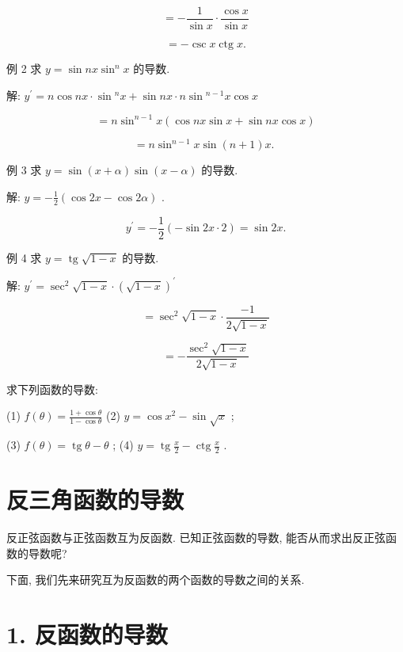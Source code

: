 \documentclass[lang=cn,newtx,12pt,scheme=chinese]{elegantbook}
\begin{document}
\[
= - \frac{1}{\sin x} \cdot \frac{\cos x}{\sin x}
\]

\[
= - \csc x\operatorname{ctg}x\text{.}
\]

例 2 求 \(y = \sin {nx}{\sin }^{n}x\) 的导数.

解: \({y}^{\prime } = n\cos {nx} \cdot \sin {}^{n}x + \sin {nx} \cdot n\sin {}^{n - 1}x\cos x\)

\[
= n{\sin }^{n - 1}x\left( {\cos {nx}\sin x + \sin {nx}\cos x}\right)
\]

\[
= n{\sin }^{n - 1}x\sin \left( {n + 1}\right) x\text{. }
\]

例 3 求 \(y = \sin \left( {x + \alpha }\right) \sin \left( {x - \alpha }\right)\) 的导数.

解: \(y = - \frac{1}{2}\left( {\cos {2x} - \cos {2\alpha }}\right)\) .

\[
{y}^{\prime } = - \frac{1}{2}\left( {-\sin {2x} \cdot 2}\right) = \sin {2x}.
\]

例 4 求 \(y = \operatorname{tg}\sqrt{1 - x}\) 的导数.

解: \({y}^{\prime } = {\sec }^{2}\sqrt{1 - x} \cdot {\left( \sqrt{1 - x}\right) }^{\prime }\)

\[
= {\sec }^{2}\sqrt{1 - x} \cdot \frac{-1}{2\sqrt{1 - x}}
\]

\[
= - \frac{{\sec }^{2}\sqrt{1 - x}}{2\sqrt{1 - x}}
\]

\begin{problemset}[练习]

\item 求下列函数的导数:

(1) \(f\left( \theta \right) = \frac{1 + \cos \theta }{1 - \cos \theta }\) (2) \(y = \cos {x}^{2} - \sin \sqrt{x}\) ;

(3) \(f\left( \theta \right) = \operatorname{tg}\theta - \theta\) ; (4) \(y = \operatorname{tg}\frac{x}{2} - \operatorname{ctg}\frac{x}{2}\) .

\end{problemset}

\section{反三角函数的导数}

反正弦函数与正弦函数互为反函数. 已知正弦函数的导数, 能否从而求出反正弦函数的导数呢?

下面, 我们先来研究互为反函数的两个函数的导数之间的关系.

\section*{1. 反函数的导数}
\end{document}
